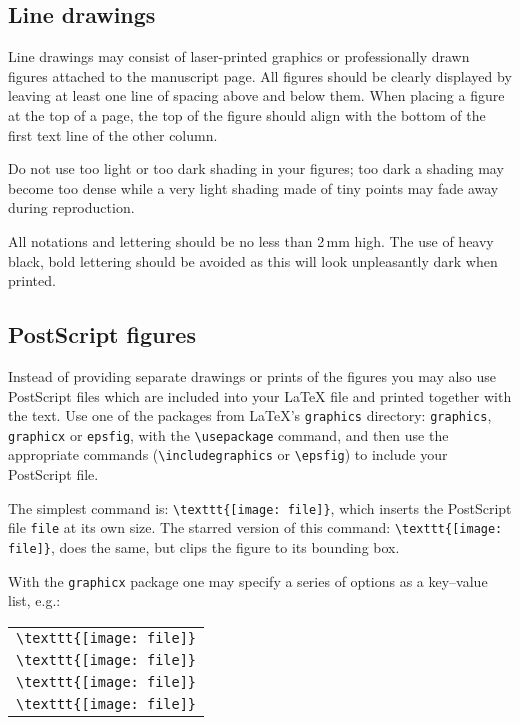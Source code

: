 \documentclass[fleqn,twoside]{article}
\begin{document}
\subsection{Line drawings}

Line drawings may consist of laser-printed graphics or professionally
drawn figures attached to the manuscript page. All figures should be
clearly displayed by leaving at least one line of spacing above and
below them. When placing a figure at the top of a page, the top of the
figure should align with the bottom of the first text line of the other
column.

Do not use too light or too dark shading in your figures; too dark a
shading may become too dense while a very light shading made of tiny
points may fade away during reproduction.

All notations and lettering should be no less than 2\,mm high. The use
of heavy black, bold lettering should be avoided as this will look
unpleasantly dark when printed.

\subsection{PostScript figures}

Instead of providing separate drawings or prints of the figures you
may also use PostScript files which are included into your \LaTeX{}
file and printed together with the text. Use one of the packages from
\LaTeX's \texttt{graphics} directory: \texttt{graphics},
\texttt{graphicx} or \texttt{epsfig}, with the \verb|\usepackage|
command, and then use the appropriate commands
(\verb|\includegraphics| or \verb|\epsfig|) to include your PostScript
file.

The simplest command is: \newline
\verb|\texttt{[image: file]}|, which inserts the
PostScript file \texttt{file} at its own size. The starred version of
this command: \newline
\verb|\texttt{[image: file]}|, does the same, but clips
the figure to its bounding box.

With the \texttt{graphicx} package one may specify a series of options
as a key--value list, e.g.:
\begin{tabular}{@{}l}
\verb|\texttt{[image: file]}|\\
\verb|\texttt{[image: file]}|\\
\verb|\texttt{[image: file]}|\\
\verb|\texttt{[image: file]}|
\end{tabular}
\end{document}
